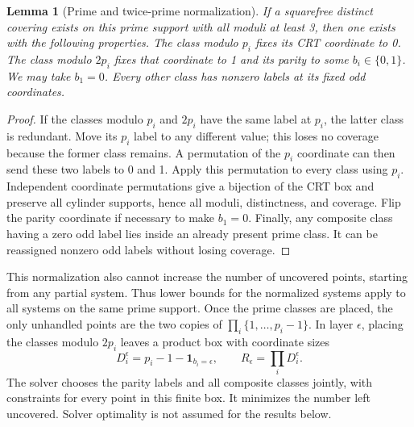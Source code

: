 \documentclass[11pt]{article}
\newtheorem{lemma}{Lemma}
\begin{document}
\begin{lemma}[Prime and twice-prime normalization]
If a squarefree distinct covering exists on this prime support with all
moduli at least 3, then one exists with the following properties. The class
modulo $p_i$ fixes its CRT coordinate to 0. The class modulo $2p_i$ fixes
that coordinate to 1 and its parity to some $b_i\in\{0,1\}$. We may take
$b_1=0$. Every other class has nonzero labels at its fixed odd coordinates.
\end{lemma}
\begin{proof}
If the classes modulo $p_i$ and $2p_i$ have the same label at $p_i$, the
latter class is redundant. Move its $p_i$ label to any different value;
this loses no coverage because the former class remains. A permutation
of the $p_i$ coordinate can then send these two labels to 0 and 1.
Apply this permutation to every class using $p_i$. Independent coordinate
permutations give a bijection of the CRT box and preserve all cylinder
supports, hence all moduli, distinctness, and coverage. Flip the parity
coordinate if necessary to make $b_1=0$. Finally, any composite class
having a zero odd label lies inside an already present prime class.
It can be reassigned nonzero odd labels without losing coverage.
\end{proof}

This normalization also cannot increase the number of uncovered points,
starting from any partial system. Thus lower bounds for the normalized
systems apply to all systems on the same prime support.
Once the prime classes are placed, the only unhandled points are the two
copies of $\prod_i\{1,\ldots,p_i-1\}$. In layer $\epsilon$, placing the
classes modulo $2p_i$ leaves a product box with coordinate sizes
\[
 D_i^\epsilon=p_i-1-\mathbf1_{b_i=\epsilon},\qquad
 R_\epsilon=\prod_iD_i^\epsilon.
\]
The solver chooses the parity labels and all composite classes jointly,
with constraints for every point in this finite box. It minimizes the
number left uncovered. Solver optimality is not assumed for the results below.
\end{document}

